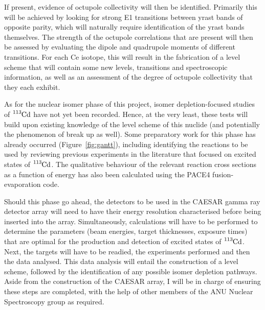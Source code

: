 \documentclass[12pt,a4paper]{article}
\begin{document}
\medskip
\noindent
If present, evidence of octupole collectivity will then be identified.
Primarily this will be achieved by looking for strong E1 transitions between yrast bands of opposite parity, which will naturally require identification of the yrast bands themselves.
The strength of the octupole correlations that are present will then be assessed by evaluating the dipole and quadrupole moments of different transitions.
For each Ce isotope, this will result in the fabrication of a level scheme that will contain some new levels, transitions and spectroscopic information, as well as an assessment of the degree of octupole collectivity that they each exhibit.

\medskip
\noindent
As for the nuclear isomer phase of this project, isomer depletion-focused studies of $\ce{^{113}Cd}$ have not yet been recorded.
Hence, at the very least, these tests will build upon existing knowledge of the level scheme of this nuclide (and potentially the phenomenon of break up as well).
Some preparatory work for this phase has already occurred (Figure~\ref{fig:gantt}), including identifying the reactions to be used by reviewing previous experiments in the literature that focused on excited states of $\ce{^{113}Cd}$.
The qualitative behaviour of the relevant reaction cross sections as a function of energy has also been calculated using the PACE4 fusion-evaporation code.

\medskip
\noindent
Should this phase go ahead, the detectors to be used in the CAESAR gamma ray detector array will need to have their energy resolution characterised before being inserted into the array.
Simultaneously, calculations will have to be performed to determine the parameters (beam energies, target thicknesses, exposure times) that are optimal for the production and detection of excited states of $\ce{^{113}Cd}$.
Next, the targets will have to be readied, the experiments performed and then the data analysed. 
This data analysis will entail the construction of a level scheme, followed by the identification of any possible isomer depletion pathways.
Aside from the construction of the CAESAR array, I will be in charge of ensuring these steps are completed, with the help of other members of the ANU Nuclear Spectroscopy group as required.
\end{document}
